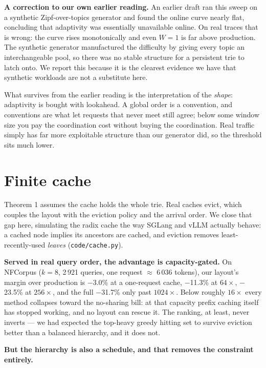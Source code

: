 \documentclass[11pt]{article}
\theoremstyle{plain}
\begin{document}
\textbf{A correction to our own earlier reading.} An earlier draft ran this sweep on a synthetic Zipf-over-topics generator and found the online curve nearly flat, concluding that adaptivity was essentially unavailable online. On real traces that is wrong: the curve rises monotonically and even $W=1$ is far above production. The synthetic generator manufactured the difficulty by giving every topic an interchangeable pool, so there was no stable structure for a persistent trie to latch onto. We report this because it is the clearest evidence we have that synthetic workloads are not a substitute here.

What survives from the earlier reading is the interpretation of the \emph{shape}: adaptivity is bought with lookahead. A global order is a convention, and conventions are what let requests that never meet still agree; below some window size you pay the coordination cost without buying the coordination. Real traffic simply has far more exploitable structure than our generator did, so the threshold sits much lower.

\section{Finite cache}

Theorem 1 assumes the cache holds the whole trie. Real caches evict, which couples the layout with the eviction policy and the arrival order. We close that gap here, simulating the radix cache the way SGLang and vLLM actually behave: a cached node implies its ancestors are cached, and eviction removes least-recently-used \emph{leaves} (\texttt{code/cache.py}).

\textbf{Served in real query order, the advantage is capacity-gated.} On NFCorpus ($k=8$, 2\,921 queries, one request $\approx$ 6\,036 tokens), our layout's margin over production is $-$3.0\% at a one-request cache, $-$11.3\% at $64\times$, $-$23.5\% at $256\times$, and the full $-$31.7\% only past $1024\times$. Below roughly $16\times$ every method collapses toward the no-sharing bill: at that capacity prefix caching itself has stopped working, and no layout can rescue it. The ranking, at least, never inverts --- we had expected the top-heavy greedy hitting set to survive eviction better than a balanced hierarchy, and it does not.

\textbf{But the hierarchy is also a schedule, and that removes the constraint entirely.}
\end{document}
